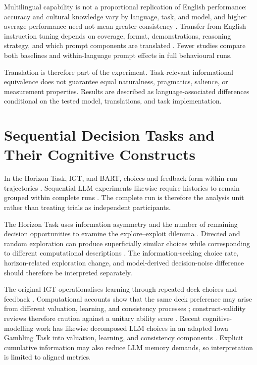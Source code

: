 \documentclass[logo,msc,inf]{infthesis}       %
\begin{document}
Multilingual capability is not a proportional replication of English performance: accuracy and cultural knowledge vary by language, task, and model, and higher average performance need not mean greater consistency \cite{Zhang2023M3Exam,Qi2023CrossLingualConsistency}. Transfer from English instruction tuning depends on coverage, format, demonstrations, reasoning strategy, and which prompt components are translated \cite{Muennighoff2023CrosslingualGeneralization,Shi2023MultilingualCoT,Mondshine2025BeyondEnglish}. Fewer studies compare both baselines and within-language prompt effects in full behavioural runs.

Translation is therefore part of the experiment. Task-relevant informational equivalence does not guarantee equal naturalness, pragmatics, salience, or measurement properties. Results are described as language-associated differences conditional on the tested model, translations, and task implementation.


\section{Sequential Decision Tasks and Their Cognitive Constructs}

In the Horizon Task, IGT, and BART, choices and feedback form within-run trajectories \cite{Wilson2014,Bechara1994,Lejuez2002}. Sequential LLM experiments likewise require histories to remain grouped within complete runs \cite{Loya2023PromptSensitivityDecision}. The complete run is therefore the analysis unit rather than treating trials as independent participants.

The Horizon Task uses information asymmetry and the number of remaining decision opportunities to examine the explore--exploit dilemma \cite{Wilson2014}. Directed and random exploration can produce superficially similar choices while corresponding to different computational descriptions \cite{Gershman2018Exploration}. The information-seeking choice rate, horizon-related exploration change, and model-derived decision-noise difference should therefore be interpreted separately.

The original IGT operationalises learning through repeated deck choices and feedback \cite{Bechara1994}. Computational accounts show that the same deck preference may arise from different valuation, learning, and consistency processes \cite{Busemeyer2002PVL,Steingroever2013PVLDelta}; construct-validity reviews therefore caution against a unitary ability score \cite{Buelow2009IGTValidity}. Recent cognitive-modelling work has likewise decomposed LLM choices in an adapted Iowa Gambling Task into valuation, learning, and consistency components \cite{Yang2026IrrationalAgent}. Explicit cumulative information may also reduce LLM memory demands, so interpretation is limited to aligned metrics.
\end{document}
